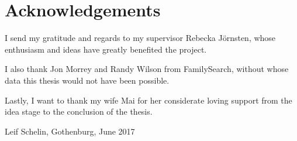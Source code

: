 \thispagestyle{plain} %
\section*{Acknowledgements}

I send my gratitude and regards to my supervisor Rebecka Jörnsten, whose enthusiasm and ideas have greatly benefited the project.

I also thank Jon Morrey and Randy Wilson from FamilySearch, without whose data this thesis would not have been possible.

Lastly, I want to thank my wife Mai for her considerate loving support from the idea stage to the conclusion of the thesis.

\vspace{1.5cm}
\hfill
Leif Schelin, Gothenburg, June 2017

\newpage
\thispagestyle{empty}
\mbox{}
